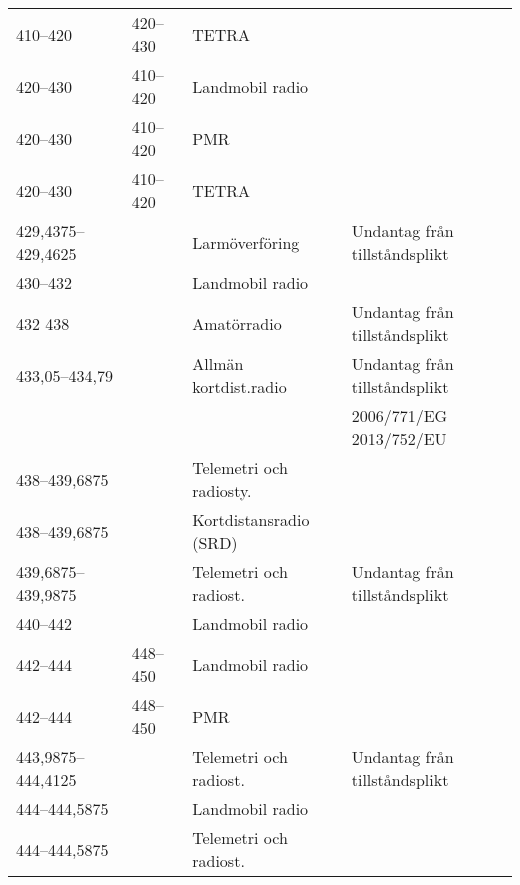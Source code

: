 \begin{landscape}
\begin{longtable}{llll}
	410--420           & 420--430           & TETRA                   &                                       \\
	420--430           & 410--420           & Landmobil radio         &                                       \\
	420--430           & 410--420           & PMR                     &                                       \\
	420--430           & 410--420           & TETRA                   &                                       \\
	429,4375--429,4625 &                    & Larmöverföring          & Undantag från tillståndsplikt         \\
	430--432           &                    & Landmobil radio         &                                       \\
	432	438        &                    & Amatörradio             & Undantag från tillståndsplikt         \\
	433,05--434,79     &                    & Allmän kortdist.radio   & Undantag från tillståndsplikt         \\
	                   &                    &                         & 2006/771/EG 2013/752/EU               \\
	438--439,6875      &                    & Telemetri och radiosty. &                                       \\
	438--439,6875      &                    & Kortdistansradio (SRD)  &                                       \\
	439,6875--439,9875 &                    & Telemetri och radiost.  & Undantag från tillståndsplikt         \\
	440--442           &                    & Landmobil radio         &                                       \\
	442--444           & 448--450           & Landmobil radio         &                                       \\
	442--444           & 448--450           & PMR                     &                                       \\
	443,9875--444,4125 &                    & Telemetri och radiost.  & Undantag från tillståndsplikt         \\
	444--444,5875      &                    & Landmobil radio         &                                       \\
	444--444,5875      &                    & Telemetri och radiost.  &                                       \\

\end{longtable}
\end{landscape}

